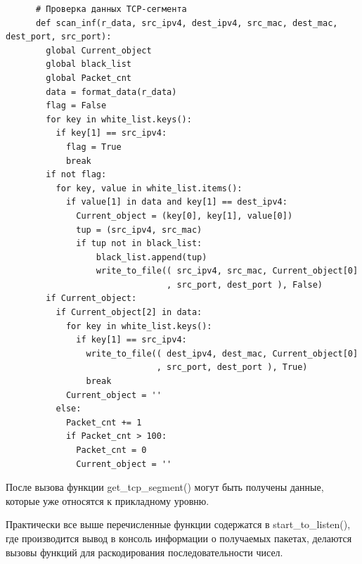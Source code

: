 \documentclass[bachelor, och, coursework]{SCWorks}
\begin{document}
    \begin{verbatim}
      # Проверка данных TCP-сегмента
      def scan_inf(r_data, src_ipv4, dest_ipv4, src_mac, dest_mac, dest_port, src_port):
        global Current_object
        global black_list
        global Packet_cnt
        data = format_data(r_data)
        flag = False
        for key in white_list.keys():
          if key[1] == src_ipv4:
            flag = True
            break
        if not flag:
          for key, value in white_list.items():
            if value[1] in data and key[1] == dest_ipv4:
              Current_object = (key[0], key[1], value[0])
              tup = (src_ipv4, src_mac)
              if tup not in black_list:
                  black_list.append(tup)
                  write_to_file(( src_ipv4, src_mac, Current_object[0]
                                , src_port, dest_port ), False)
        if Current_object:
          if Current_object[2] in data:
            for key in white_list.keys():
              if key[1] == src_ipv4:
                write_to_file(( dest_ipv4, dest_mac, Current_object[0]
                              , src_port, dest_port ), True)
                break
            Current_object = ''
          else:
            Packet_cnt += 1
            if Packet_cnt > 100:
              Packet_cnt = 0
              Current_object = '' 
    \end{verbatim}
    
    После вызова функции get\_tcp\_segment() могут быть получены данные, которые уже относятся к прикладному уровню.

    Практически все выше перечисленные функции содержатся в start\_to\_listen(), где производится вывод в консоль информации о получаемых пакетах, делаются
    вызовы функций для раскодирования последовательности чисел.
\end{document}
